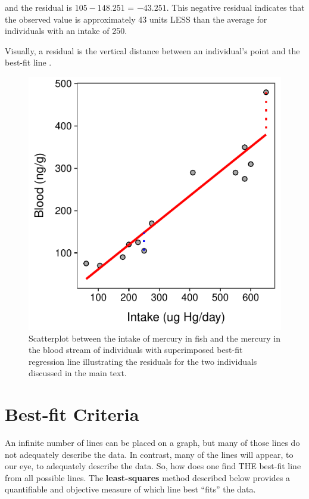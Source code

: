 \documentclass[10pt,openany]{book}\usepackage[]{graphicx}\usepackage[]{color}
\newenvironment{knitrout}{}{} %
\begin{document}
and the residual is $105-148.251$ = $-43.251$. This negative residual indicates that the observed value is approximately 43 units LESS than the average for individuals with an intake of 250.

Visually, a residual is the vertical distance between an individual's point and the best-fit line .

\begin{knitrout}
\color{fgcolor}\begin{figure}[hbtp]

{\centering \includegraphics[width=.4\linewidth]{Figs/HGresidual-1} 

}

\caption[Scatterplot between the intake of mercury in fish and the mercury in the blood stream of individuals with superimposed best-fit regression line illustrating the residuals for the two individuals discussed in the main text]{Scatterplot between the intake of mercury in fish and the mercury in the blood stream of individuals with superimposed best-fit regression line illustrating the residuals for the two individuals discussed in the main text.}\label{fig:HGresidual}
\end{figure}


\end{knitrout}

\section{Best-fit Criteria}\label{sect:BestFitLine}
An infinite number of lines can be placed on a graph, but many of those lines do not adequately describe the data. In contrast, many of the lines will appear, to our eye, to adequately describe the data. So, how does one find THE best-fit line from all possible lines. The \textbf{least-squares} method described below provides a quantifiable and objective measure of which line best ``fits'' the data.
\end{document}
